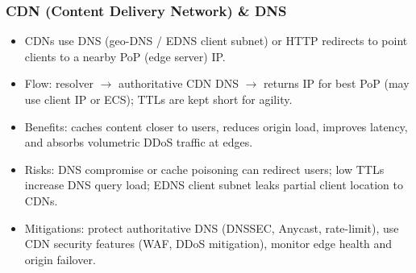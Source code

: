 \documentclass[12pt]{article}
\begin{document}
\subsubsection{CDN (Content Delivery Network) \& DNS}
\begin{itemize}
  \item CDNs use DNS (geo-DNS / EDNS client subnet) or HTTP redirects to point clients to a nearby PoP (edge server) IP.
  \item Flow: resolver $\to$ authoritative CDN DNS $\to$ returns IP for best PoP (may use client IP or ECS); TTLs are kept short for agility.
  \item Benefits: caches content closer to users, reduces origin load, improves latency, and absorbs volumetric DDoS traffic at edges.
  \item Risks: DNS compromise or cache poisoning can redirect users; low TTLs increase DNS query load; EDNS client subnet leaks partial client location to CDNs.
  \item Mitigations: protect authoritative DNS (DNSSEC, Anycast, rate-limit), use CDN security features (WAF, DDoS mitigation), monitor edge health and origin failover.
\end{itemize}

\hrulefill
\end{document}
